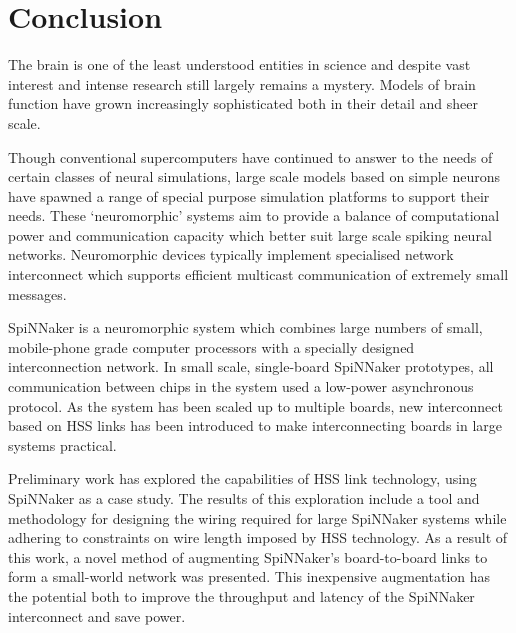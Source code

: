 \chapter{Conclusion}
	
	
	The brain is one of the least understood entities in science and despite vast
	interest and intense research still largely remains a mystery. Models of brain
	function have grown increasingly sophisticated both in their detail and sheer
	scale.
	
	Though conventional supercomputers have continued to answer to the needs of
	certain classes of neural simulations, large scale models based on simple
	neurons have spawned a range of special purpose simulation platforms to
	support their needs. These `neuromorphic' systems aim to provide a balance of
	computational power and communication capacity which better suit large scale
	spiking neural networks. Neuromorphic devices typically implement specialised
	network interconnect which supports efficient multicast communication of
	extremely small messages.
	
	SpiNNaker is a neuromorphic system which combines large numbers of small,
	mobile-phone grade computer processors with a specially designed
	interconnection network. In small scale, single-board SpiNNaker prototypes,
	all communication between chips in the system used a low-power asynchronous
	protocol. As the system has been scaled up to multiple boards, new
	interconnect based on HSS links has been introduced to make interconnecting
	boards in large systems practical.
	
	Preliminary work has explored the capabilities of HSS link technology, using
	SpiNNaker as a case study. The results of this exploration include a tool and
	methodology for designing the wiring required for large SpiNNaker systems
	while adhering to constraints on wire length imposed by HSS technology. As a
	result of this work, a novel method of augmenting SpiNNaker's board-to-board
	links to form a small-world network was presented. This inexpensive
	augmentation has the potential both to improve the throughput and latency of
	the SpiNNaker interconnect and save power.
	
